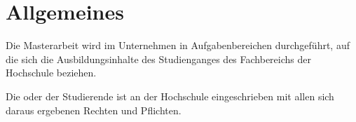 \section{Allgemeines}

Die Masterarbeit wird im Unternehmen in Aufgabenbereichen durchgeführt, auf die sich die Ausbildungsinhalte des Studienganges \spaceLine des Fachbereichs \departement der Hochschule \college beziehen.

Die oder der Studierende ist an der Hochschule \college eingeschrieben mit allen sich daraus ergebenen Rechten und Pflichten.
